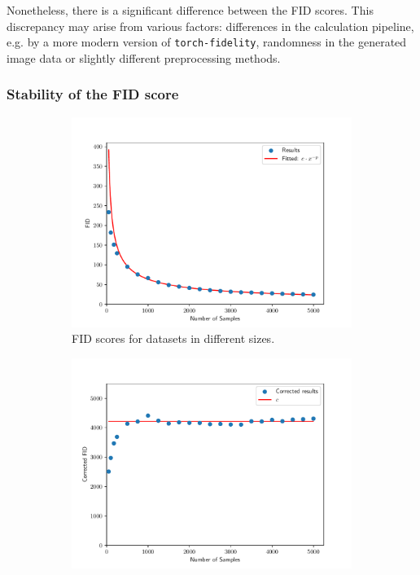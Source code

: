 \documentclass[11pt]{article}
\begin{document}
Nonetheless, there is a significant difference between the FID scores. This discrepancy may arise from various factors: differences in the calculation pipeline, e.g. by a more modern version of \texttt{torch-fidelity}, randomness in the generated image data or slightly different preprocessing methods.

\subsubsection{Stability of the FID score}
\begin{figure}
    \centering
    \begin{subfigure}{0.49\textwidth}
        \includegraphics[width=\textwidth]{assets/num_samples_comparison.pdf}
        \caption{FID scores for datasets in different sizes.}
        \label{fig:num_samples_comparison}
    \end{subfigure}
    \hfill
    \begin{subfigure}{0.49\textwidth}
        \includegraphics[width=\textwidth]{assets/num_samples_comparison_corrected.pdf}

\end{subfigure}
\end{figure}
\end{document}
